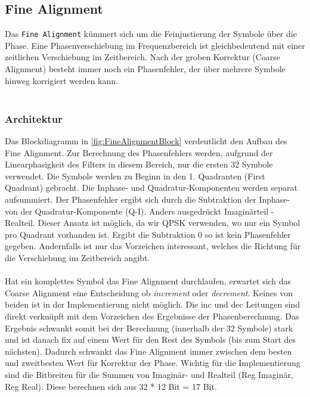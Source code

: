 \subsection{Fine Alignment}

Das \texttt{Fine Alignment} kümmert sich um die Feinjustierung der Symbole über die Phase. Eine Phasenverschiebung im Frequenzbereich ist gleichbedeutend mit einer zeitlichen Verschiebung im Zeitbereich. Nach der groben Korrektur (Coarse Alignment) besteht immer noch ein Phasenfehler, der über mehrere Symbole hinweg korrigiert werden kann.\\
\\


\subsubsection{Architektur}
Das Blockdiagramm in \autoref{fig:FineAlignmentBlock} verdeutlicht den Aufbau des Fine Alignment. Zur Berechnung des Phasenfehlers werden, aufgrund der Linearphasigkeit des Filters in diesem Bereich, nur die ersten 32 Symbole verwendet. Die Symbole werden zu Beginn in den 1. Quadranten (First Quadrant) gebracht. Die Inphase- und Quadratur-Komponenten werden separat aufsummiert. Der Phasenfehler ergibt sich durch die Subtraktion der Inphase- von der Quadratur-Komponente (Q-I). Anders ausgedrückt Imaginärteil - Realteil. Dieser Ansatz ist möglich, da wir QPSK verwenden, wo nur ein Symbol pro Quadrant vorhanden ist. Ergibt die Subtraktion 0 so ist kein Phasenfehler gegeben. Andernfalls ist nur das Vorzeichen interessant, welches die Richtung für die Verschiebung im Zeitbereich angibt.\\
\\
Hat ein komplettes Symbol das Fine Alignment durchlaufen, erwartet sich das Coarse Alignment eine Entscheidung ob \textit{increment} oder \textit{decrement}. Keines von beiden ist in der Implementierung nicht möglich. Die inc und dec Leitungen sind direkt verknüpft mit dem Vorzeichen des Ergebnisse der Phasenberechnung. Das Ergebnis schwankt somit bei der Berechnung (innerhalb der 32 Symbole) stark und ist danach fix auf einem Wert für den Rest des Symbols (bis zum Start des nächsten). Dadurch schwankt das Fine Alignment immer zwischen dem besten und zweitbesten Wert für Korrektur der Phase. Wichtig für die Implementierung sind die Bitbreiten für die Summen von Imaginär- und Realteil (Reg Imaginär, Reg Real). Diese berechnen sich aus 32 * 12 Bit = 17 Bit.

